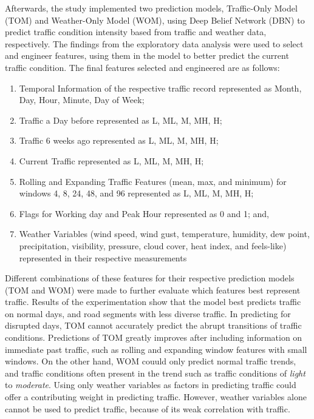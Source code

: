 Afterwards, the study implemented two prediction models, Traffic-Only Model (TOM) and Weather-Only Model (WOM), using Deep Belief Network (DBN) to predict traffic condition intensity based from traffic and weather data, respectively. The findings from the exploratory data analysis were used to select and engineer features, using them in the model to better predict the current traffic condition. The final features selected and engineered are as follows:

\begin{enumerate}
\item Temporal Information of the respective traffic record represented as Month, Day, Hour, Minute, Day of Week;
\item Traffic a Day before represented as L, ML, M, MH, H;
\item Traffic 6 weeks ago represented as L, ML, M, MH, H;
\item Current Traffic represented as L, ML, M, MH, H;
\item Rolling and Expanding Traffic Features (mean, max, and minimum) for windows 4, 8, 24, 48, and 96 represented as L, ML, M, MH, H;
\item Flags for Working day and Peak Hour represented as 0 and 1; and,
\item Weather Variables (wind speed, wind gust, temperature, humidity, dew point, precipitation, visibility, pressure, cloud cover, heat index, and feels-like) represented in their respective measurements 
\end{enumerate}

Different combinations of these features for their respective prediction models (TOM and WOM) were made to further evaluate which features best represent traffic. Results of the experimentation show that the model best predicts traffic on normal days, and road segments with less diverse traffic. In predicting for disrupted days, TOM cannot accurately predict the abrupt transitions of traffic conditions. Predictions of TOM greatly improves after including information on immediate past traffic, such as rolling and expanding window features with small windows. On the other hand, WOM couuld only predict normal traffic trends, and traffic conditions often present in the trend such as traffic conditions of \textit{light} to \textit{moderate}. Using only weather variables as factors in predicting traffic could offer a contributing weight in predicting traffic. However, weather variables alone cannot be used to predict traffic, because of its weak correlation with traffic. 

